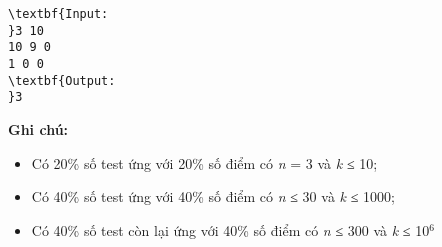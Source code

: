\begin{verbatim}
\textbf{Input:
}3 10
10 9 0
1 0 0
\textbf{Output:
}3
\end{verbatim}

\textbf{\textbf{Ghi chú:}}
\begin{itemize}
	\item Có 20\% số test ứng với 20\% số điểm có \emph{n }= 3 và \emph{k} ≤ 10;
	\item Có 40\% số test ứng với 40\% số điểm có \emph{n }≤ 30 và \emph{k} ≤ 1000;
	\item Có 40\% số test còn lại ứng với 40\% số điểm có \emph{n }≤ 300 và \emph{k} ≤ 10$^6$
\end{itemize}